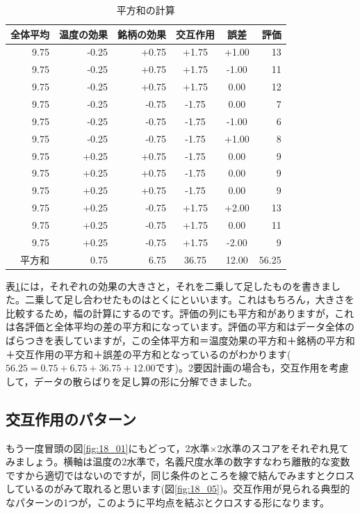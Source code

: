 \documentclass{ltjbook}
\begin{document}
\begin{table}[ht]
	\centering
	\caption{平方和の計算}
	\begin{tabular}{rrrccr}
		\hline
		全体平均 & 温度の効果 & 銘柄の効果 & 交互作用  & 誤差    & 評価    \\
		\hline
		9.75 & -0.25 & +0.75 & +1.75 & +1.00 & 13    \\
		9.75 & -0.25 & +0.75 & +1.75 & -1.00 & 11    \\
		9.75 & -0.25 & +0.75 & +1.75 & 0.00  & 12    \\ \hline
		9.75 & -0.25 & -0.75 & -1.75 & 0.00  & 7     \\
		9.75 & -0.25 & -0.75 & -1.75 & -1.00 & 6     \\
		9.75 & -0.25 & -0.75 & -1.75 & +1.00 & 8     \\ \hline
		9.75 & +0.25 & +0.75 & -1.75 & 0.00  & 9     \\
		9.75 & +0.25 & +0.75 & -1.75 & 0.00  & 9     \\
		9.75 & +0.25 & +0.75 & -1.75 & 0.00  & 9     \\ \hline
		9.75 & +0.25 & -0.75 & +1.75 & +2.00 & 13    \\
		9.75 & +0.25 & -0.75 & +1.75 & 0.00  & 11    \\
		9.75 & +0.25 & -0.75 & +1.75 & -2.00 & 9     \\
		\hline\hline
		平方和  & 0.75  & 6.75  & 36.75 & 12.00 & 56.25 \\\hline
	\end{tabular}
	\label{tbl:18_06}
\end{table}
表\ref{tbl:18_06}には，それぞれの効果の大きさと，それを二乗して足したものを書きました。二乗して足し合わせたものはとくにといいます。これはもちろん，大きさを比較するため，幅の計算にするのです。評価の列にも平方和がありますが，これは各評価と全体平均の差の平方和になっています。評価の平方和はデータ全体のばらつきを表していますが，この全体平方和＝温度効果の平方和＋銘柄の平方和＋交互作用の平方和＋誤差の平方和となっているのがわかります($56.25=0.75+6.75+36.75+12.00$です)。2要因計画の場合も，交互作用を考慮して，データの散らばりを足し算の形に分解できました。

\subsection{交互作用のパターン}
もう一度冒頭の図\ref{fig:18_01}にもどって，2水準$\times$2水準のスコアをそれぞれ見てみましょう。横軸は温度の2水準で，名義尺度水準の数字すなわち離散的な変数ですから適切ではないのですが，同じ条件のところを線で結んでみますとクロスしているのがみて取れると思います(図\ref{fig:18_05})。交互作用が見られる典型的なパターンの1つが，このように平均点を結ぶとクロスする形になります。
\end{document}
